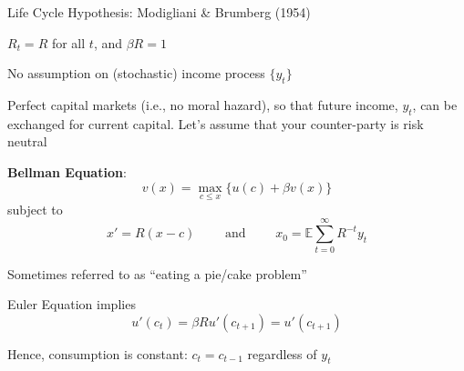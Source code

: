 \documentclass[11pt, aspectratio=169]{beamer}
\newenvironment{witemize}{\itemize\addtolength{\itemsep}{10pt}}{\enditemize}
\begin{document}
\begin{frame}{}
Life Cycle Hypothesis: Modigliani \& Brumberg (1954)
\vspace{3mm}
\begin{witemize}
\item $R_t = R$ for all $t$, and $\beta R = 1$

\item No assumption on (stochastic) income process $\{y_t\}$

\item Perfect capital markets (i.e., no moral hazard), so that future income, $y_t$, can be exchanged for current capital. Let's assume that your counter-party is risk neutral
\end{witemize}
\end{frame}


\begin{frame}{}

\textbf{Bellman Equation}:
\begin{equation*}
	v(x) = \max_{c \leq x} \Big\{u(c) + \beta v(x) \Big\} 
\end{equation*}
subject to
\begin{equation*}
	x' = R(x - c) 
	\quad\quad \text{ and } \quad\quad
	x_0 = \mathbb E \sum_{t=0}^\infty R^{-t} y_t
\end{equation*}

\vspace{3mm}
\begin{witemize}
\item Sometimes referred to as ``eating a pie/cake problem''

\item Euler Equation implies
\begin{equation*}
	u'(c_t) = \beta R u'(c_{t+1}) = u'(c_{t+1}) 
\end{equation*}

\item Hence, consumption is constant: $c_t = c_{t-1}$ regardless of $y_t$
\end{witemize}
\end{frame}
\end{document}
